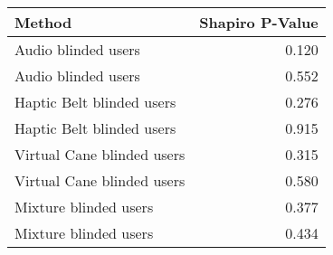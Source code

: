 
\centering
\begin{tabular}{lr}
\toprule
                    Method &  Shapiro P-Value \\
\midrule
       Audio blinded users &            0.120 \\
       Audio blinded users &            0.552 \\
 Haptic Belt blinded users &            0.276 \\
 Haptic Belt blinded users &            0.915 \\
Virtual Cane blinded users &            0.315 \\
Virtual Cane blinded users &            0.580 \\
     Mixture blinded users &            0.377 \\
     Mixture blinded users &            0.434 \\
\bottomrule
\end{tabular}
